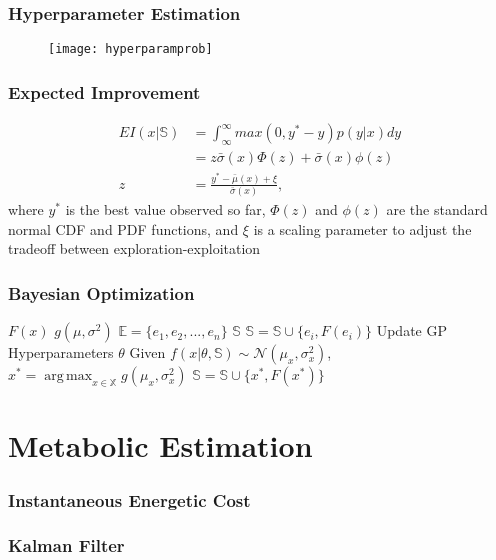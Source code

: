 \documentclass[compress, xcolor=pst]{beamer}
\DeclareMathOperator*{\argmax}{arg\,max}
\begin{document}
\begin{frame}
	\frametitle{\textbf{Hyperparameter Estimation}}
	\begin{figure}
	\centering
	\texttt{[image: hyperparamprob]}
	\end{figure}
\end{frame}

\begin{frame}
	\frametitle{\textbf{Expected Improvement}}
	\begin{align*}
	  EI(x\vert \mathbb{S}) &= \int_\infty^\infty max(0, y^*-y)p(y\vert x)dy\\
	    &= z\bar{\sigma}(x)\Phi(z) + \bar{\sigma}(x)\phi(z)\\
	  z &= \frac{y^* - \bar{\mu}(x) + \xi}{\bar{\sigma}(x)},
	\end{align*}
	where $y^*$ is the best value observed so far, $\Phi(z)$ and $\phi(z)$ are the standard normal CDF and PDF functions, and $\xi$ is a scaling parameter to adjust the tradeoff between exploration-exploitation
\end{frame}

\begin{frame}
	\frametitle{\textbf{Bayesian Optimization}}
	\begin{algorithmic}
	\State {} $F(x)$
	\State {} $g(\mu, \sigma^2)$
	\State {} $\mathbb{E} = \{e_1, e_2, ..., e_n\}$
	\State {} $\mathbb{S}$
	  \State $\mathbb{S} = \mathbb{S} \cup \{e_i, F(e_i)\}$
	\End
	  \State Update GP Hyperparameters $\theta$
	  \State Given $f(x\vert \theta, \mathbb{S}) \sim \mathcal{N}(\mu_x, \sigma_x^2)$,
	  \State $x^* = \argmax_{x \in \mathbb{X}} g(\mu_x, \sigma_x^2)$
	  \State $\mathbb{S} = \mathbb{S} \cup \{x^*, F(x^*)\}$
	\End
	\end{algorithmic}
\end{frame}

\section{Metabolic Estimation}
\begin{frame}
	\frametitle{\textbf{Instantaneous Energetic Cost}}
	
\end{frame}

\begin{frame}
	\frametitle{\textbf{Kalman Filter}}
\end{frame}
\end{document}
